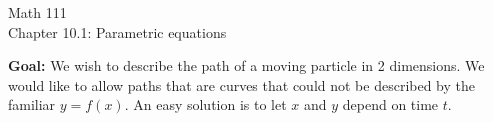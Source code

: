 \documentclass[11pt]{article}
\begin{document}
\begin{center}
\Large
\rm{Math 111}
\\
\rm{Chapter 10.1:  Parametric equations}
\\
\end{center}
\vspace{0.2in}

{\bf Goal:}  We wish to describe the path of a moving particle in 2 dimensions.  We would like to allow paths that are
curves that could not be described by the familiar $y=f(x)$.  An easy solution is to let $x$ and $y$ depend on time $t$.









\vspace{2in}
\end{document}
